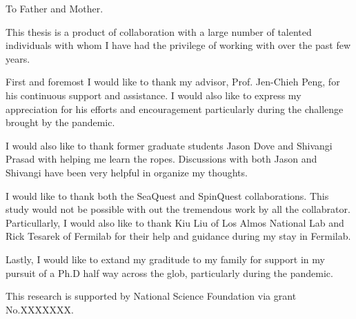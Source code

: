 \begin{dedication}
To Father and Mother.
\end{dedication}

\begin{acknowledgments}
This thesis is a product of collaboration with a large number of talented 
individuals with whom I have had the privilege of working with over the past 
few years.

First and foremost I would like to thank my advisor, Prof. Jen-Chieh Peng, for 
his continuous support and assistance. I would also like to express my 
appreciation for his efforts and encouragement particularly during the 
challenge brought by the pandemic. 

I would also like to thank former graduate students Jason Dove and Shivangi 
Prasad with helping me learn the ropes. Discussions with both Jason and 
Shivangi have been very helpful in organize my thoughts.

I would like to thank both the SeaQuest and SpinQuest collaborations. 
This study would not be possible with out the tremendous work by all the 
collabrator. Particullarly, I would also like to thank Kiu Liu of Los Almos 
National Lab and Rick Tesarek of Fermilab for their help and guidance during my
stay in Fermilab.

Lastly, I would like to extand my graditude to my family for support in my 
pursuit of a Ph.D half way across the glob, particularly during the pandemic. 

This research is supported by National Science Foundation via grant No.XXXXXXX.

\end{acknowledgments}

